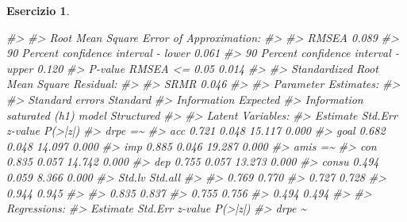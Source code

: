 \documentclass[
  11pt,
]{krantz}
\makeatletter
\newenvironment{Shaded}{\begin{snugshade}}{\end{snugshade}}
\newcommand{\CommentTok}[1]{\textcolor[rgb]{0.37,0.37,0.37}{\textit{#1}}}
\newenvironment{kframe}{%
\medskip{}
\setlength{\fboxsep}{.8em}
 \def\at@end@of@kframe{}%
 \ifinner\ifhmode%
  \def\at@end@of@kframe{\end{minipage}}%
  \begin{minipage}{\columnwidth}%
 \fi\fi%
 \def\FrameCommand##1{\hskip\@totalleftmargin \hskip-\fboxsep
 \colorbox{shadecolor}{##1}\hskip-\fboxsep
     \hskip-\linewidth \hskip-\@totalleftmargin \hskip\columnwidth}%
 \MakeFramed {\advance\hsize-\width
   \@totalleftmargin\z@ \linewidth\hsize
   \@setminipage}}%
 {\par\unskip\endMakeFramed%
 \at@end@of@kframe}
\renewenvironment{Shaded}{\begin{kframe}}{\end{kframe}}
\theoremstyle{definition}
\theoremstyle{definition}
\theoremstyle{definition}
\newtheorem{exercise}{Esercizio}[chapter]
\theoremstyle{definition}
\theoremstyle{remark}
\makeatother
\begin{document}
\begin{exercise}
\begin{Shaded}
\begin{Highlighting}[]
\CommentTok{\#\textgreater{} }
\CommentTok{\#\textgreater{} Root Mean Square Error of Approximation:}
\CommentTok{\#\textgreater{} }
\CommentTok{\#\textgreater{}   RMSEA                                          0.089}
\CommentTok{\#\textgreater{}   90 Percent confidence interval {-} lower         0.061}
\CommentTok{\#\textgreater{}   90 Percent confidence interval {-} upper         0.120}
\CommentTok{\#\textgreater{}   P{-}value RMSEA \textless{}= 0.05                          0.014}
\CommentTok{\#\textgreater{} }
\CommentTok{\#\textgreater{} Standardized Root Mean Square Residual:}
\CommentTok{\#\textgreater{} }
\CommentTok{\#\textgreater{}   SRMR                                           0.046}
\CommentTok{\#\textgreater{} }
\CommentTok{\#\textgreater{} Parameter Estimates:}
\CommentTok{\#\textgreater{} }
\CommentTok{\#\textgreater{}   Standard errors                             Standard}
\CommentTok{\#\textgreater{}   Information                                 Expected}
\CommentTok{\#\textgreater{}   Information saturated (h1) model          Structured}
\CommentTok{\#\textgreater{} }
\CommentTok{\#\textgreater{} Latent Variables:}
\CommentTok{\#\textgreater{}                    Estimate  Std.Err  z{-}value  P(\textgreater{}|z|)}
\CommentTok{\#\textgreater{}   drpe =\textasciitilde{}                                             }
\CommentTok{\#\textgreater{}     acc               0.721    0.048   15.117    0.000}
\CommentTok{\#\textgreater{}     goal              0.682    0.048   14.097    0.000}
\CommentTok{\#\textgreater{}     imp               0.885    0.046   19.287    0.000}
\CommentTok{\#\textgreater{}   amis =\textasciitilde{}                                             }
\CommentTok{\#\textgreater{}     con               0.835    0.057   14.742    0.000}
\CommentTok{\#\textgreater{}     dep               0.755    0.057   13.273    0.000}
\CommentTok{\#\textgreater{}     consu             0.494    0.059    8.366    0.000}
\CommentTok{\#\textgreater{}    Std.lv  Std.all}
\CommentTok{\#\textgreater{}                   }
\CommentTok{\#\textgreater{}     0.769    0.770}
\CommentTok{\#\textgreater{}     0.727    0.728}
\CommentTok{\#\textgreater{}     0.944    0.945}
\CommentTok{\#\textgreater{}                   }
\CommentTok{\#\textgreater{}     0.835    0.837}
\CommentTok{\#\textgreater{}     0.755    0.756}
\CommentTok{\#\textgreater{}     0.494    0.494}
\CommentTok{\#\textgreater{} }
\CommentTok{\#\textgreater{} Regressions:}
\CommentTok{\#\textgreater{}                    Estimate  Std.Err  z{-}value  P(\textgreater{}|z|)}
\CommentTok{\#\textgreater{}   drpe \textasciitilde{}                                              }

\end{Highlighting}
\end{Shaded}
\end{exercise}
\end{document}
